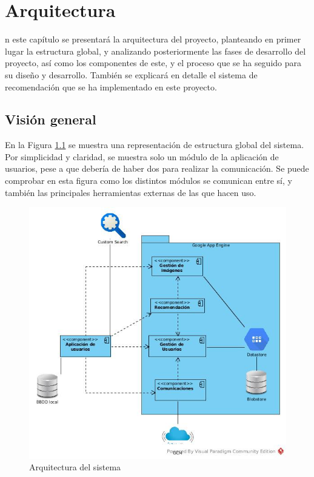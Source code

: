 \chapter{Arquitectura}
\label{chap:arquitectura}

\noindent
{}n este capítulo se presentará la arquitectura del proyecto, planteando en primer lugar la estructura global, y analizando posteriormente las fases de desarrollo del proyecto, así como los componentes de este, y el proceso que se ha seguido para su diseño y desarrollo. También se explicará en detalle el sistema de recomendación que se ha implementado en este proyecto.

\section{Visión general}
En la Figura \ref{fig:arquitecture-diagram} se muestra una representación de estructura global del sistema. Por simplicidad y claridad, se muestra solo un módulo de la aplicación de usuarios, pese a que debería de haber dos para realizar la comunicación. Se puede comprobar en esta figura como los distintos módulos se comunican entre sí, y también las principales herramientas externas de las que hacen uso.


\begin{figure}[!h]
\begin{center}
\includegraphics[width=1.1\textwidth]{./figures/arquitectura.jpg}
\caption[Arquitectura del sistema]{Arquitectura del sistema}
\label{fig:arquitecture-diagram}
\end{center}
\end{figure}


